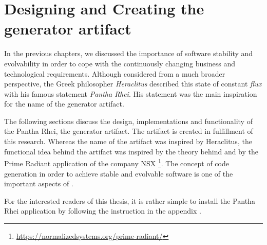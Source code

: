 \section{Designing and Creating the generator artifact} \label{sec_generator_artifact}

In the previous chapters, we discussed the importance of software stability and
evolvability in order to cope with the continuously changing business and technological
requirements. Although considered from a much broader perspective, the Greek philosopher
\emph{Heraclitus} described this state of constant \emph{flux} with his famous statement
\emph{Pantha Rhei}. His statement was the main inspiration for the name of the generator
artifact.

The following sections discuss the design, implementations and functionality of the Pantha
Rhei, the generator artifact. The artifact is created in fulfillment of this research.
Whereas the name of the artifact was inspired by Heraclitus, the functional idea behind
the artifact was inspired by the theory behind \ns and by the Prime Radiant
application of the company NSX
\footnote{\url{https://normalizedsystems.org/prime-radiant/}}. The concept of code
generation in order to achieve stable and evolvable software is one of the important aspects
of \ns.

For the interested readers of this thesis, it is rather simple to install the Pantha Rhei
application by following the instruction in the appendix
.








